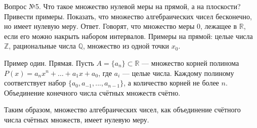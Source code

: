 \documentclass[12pt, a4paper]{article}
\begin{document}
Вопрос №5. Что такое множество нулевой меры на прямой, а на плоскости? Привести примеры. Показать, что множество алгебраических чисел бесконечно, но имеет нулевую меру. Ответ. Говорят, что множество меры $0$, лежащее в $\mathbb{R}$, если его можно накрыть набором интервалов. Примеры на прямой: целые числа $\mathbb{Z}$, рациональные числа $\mathbb{Q}$, множество из одной точки $x_0$. 

Пример один. Прямая. Пусть $A = \{a_n\} \subset \mathbb{R}$ — множество корней полинома $P(x) = a_n x^n + \dots + a_1 x + a_0$, где $a_i$ — целые числа. Каждому полиному соответствует набор $\{a_0, a_{-1}, ..., a_{n-1}\}$, а количество корней не более $n$. Объединение конечного числа счётных множеств счётно. 

Таким образом, множество алгебраических чисел, как объединение счётного числа счётных множеств, имеет нулевую меру.
\end{document}
